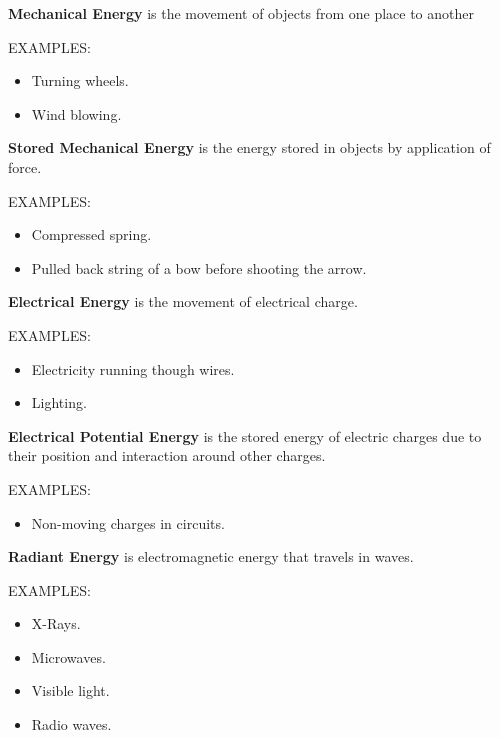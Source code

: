 \begin{definition}
	\textbf{Mechanical Energy} is the movement of objects from one place to
	another

	EXAMPLES:
	\begin{itemize}
		\item Turning wheels.
		\item Wind blowing.
	\end{itemize}
\end{definition}

\begin{definition}
	\textbf{Stored Mechanical Energy} is the energy stored in objects by
	application of force.

	EXAMPLES:
	\begin{itemize}
		\item Compressed spring.
		\item Pulled back string of a bow before shooting the arrow.
	\end{itemize}
\end{definition}

\begin{definition}
	\textbf{Electrical Energy} is the movement of electrical charge.

	EXAMPLES:
	\begin{itemize}
		\item Electricity running though wires.
		\item Lighting.
	\end{itemize}
\end{definition}

\begin{definition}
	\textbf{Electrical Potential Energy} is the stored energy of electric charges
	due to their position and interaction around other charges.

	EXAMPLES:
	\begin{itemize}
		\item Non-moving charges in circuits.
	\end{itemize}
\end{definition}

\begin{definition}
	\textbf{Radiant Energy} is electromagnetic energy that travels in waves.

	EXAMPLES:
	\begin{itemize}
		\item X-Rays.
		\item Microwaves.
		\item Visible light.
		\item Radio waves.
	\end{itemize}
\end{definition}

